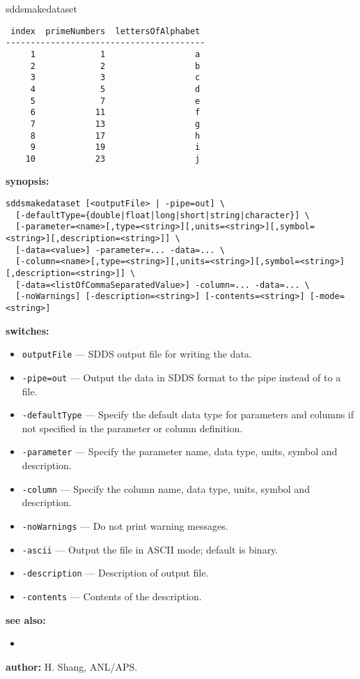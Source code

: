 \begin{sddsprog}{sddsmakedataset}
\begin{verbatim}
 index  primeNumbers  lettersOfAlphabet
----------------------------------------
     1             1                  a
     2             2                  b
     3             3                  c
     4             5                  d
     5             7                  e
     6            11                  f
     7            13                  g
     8            17                  h
     9            19                  i
    10            23                  j
\end{verbatim}
\item {\bf synopsis:}
\begin{verbatim}
sddsmakedataset [<outputFile> | -pipe=out] \
  [-defaultType={double|float|long|short|string|character}] \
  [-parameter=<name>[,type=<string>][,units=<string>][,symbol=<string>][,description=<string>]] \
  [-data=<value>] -parameter=... -data=... \
  [-column=<name>[,type=<string>][,units=<string>][,symbol=<string>][,description=<string>]] \
  [-data=<listOfCommaSeparatedValue>] -column=... -data=... \
  [-noWarnings] [-description=<string>] [-contents=<string>] [-mode=<string>]
\end{verbatim}
\item {\bf switches:}
\begin{itemize}
  \item \verb|outputFile| --- SDDS output file for writing the data.
  \item \verb|-pipe=out| --- Output the data in SDDS format to the pipe instead of to a file.
  \item \verb|-defaultType| --- Specify the default data type for parameters and columns if not specified in the parameter or column definition.
  \item \verb|-parameter| --- Specify the parameter name, data type, units, symbol and description.
  \item \verb|-column| --- Specify the column name, data type, units, symbol and description.
  \item \verb|-noWarnings| --- Do not print warning messages.
  \item \verb|-ascii| --- Output the file in ASCII mode; default is binary.
  \item \verb|-description| --- Description of output file.
  \item \verb|-contents| --- Contents of the description.
\end{itemize}
\item {\bf see also:}
\begin{itemize}
  \item \progref{sddsprintout}
\end{itemize}
\item {\bf author:} H. Shang, ANL/APS.
\end{sddsprog}
